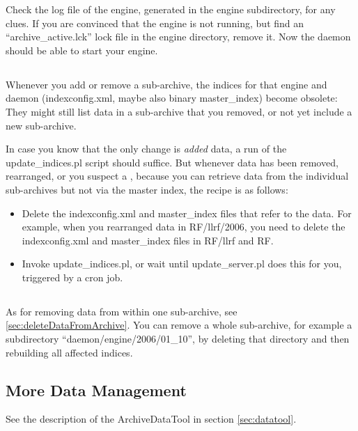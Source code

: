 Check the log file of the engine, generated in the engine
subdirectory, for any clues. If you are convinced that the engine is
not running, but find an ``archive\_active.lck'' lock file in the
engine directory, remove it. Now the daemon should be able to start
your engine.

\subsection{}
Whenever you add or remove a sub-archive, the indices for that engine
and daemon (indexconfig.xml, maybe also binary master\_index)
become obsolete: They might still list data in a
sub-archive that you removed, or not yet include a new
sub-archive.

In case you know that the only change is \emph{added} data, a run of the
update\_indices.pl script should suffice. But whenever data has been
removed, rearranged, or you suspect a ,
because you can retrieve data from the individual sub-archives but not
via the master index, the recipe is as follows:
\begin{itemize}
\item Delete the indexconfig.xml and master\_index files that refer to
      the data. For example, when you rearranged data in RF/llrf/2006,
      you need to delete the indexconfig.xml and master\_index files
      in RF/llrf and RF.
\item Invoke update\_indices.pl, or wait until update\_server.pl
      does this for you, triggered by a cron job.
\end{itemize}

\subsection{}
As for removing data from within one sub-archive, see 
\ref{sec:deleteDataFromArchive}.
You can remove a whole sub-archive, for example a subdirectory
``daemon/engine/2006/01\_10'', by deleting that directory and then rebuilding
all affected indices.

\subsection{More Data Management}
See the description of the ArchiveDataTool in section \ref{sec:datatool}.
